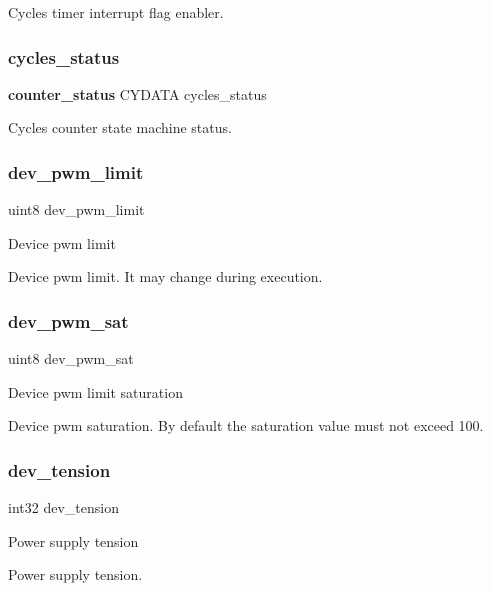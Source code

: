 Cycles timer interrupt flag enabler. \mbox{\label{globals_8h_a9087b28d15f17c6475922ba6943b14f3}} 
\subsubsection{cycles\+\_\+status}
{\footnotesize\ttfamily \textbf{ counter\+\_\+status} C\+Y\+D\+A\+TA cycles\+\_\+status}

Cycles counter state machine status. \mbox{\label{globals_8h_a21f4f67e4203dea0b9956589eaa6cef3}} 
\subsubsection{dev\+\_\+pwm\+\_\+limit}
{\footnotesize\ttfamily uint8 dev\+\_\+pwm\+\_\+limit}

Device pwm limit

Device pwm limit. It may change during execution. \mbox{\label{globals_8h_ad5c7a08c9d0e804a0db2d6f169976a13}} 
\subsubsection{dev\+\_\+pwm\+\_\+sat}
{\footnotesize\ttfamily uint8 dev\+\_\+pwm\+\_\+sat}

Device pwm limit saturation

Device pwm saturation. By default the saturation value must not exceed 100. \mbox{\label{globals_8h_a53a494e9edc739a4f7c884778d1a93b1}} 
\subsubsection{dev\+\_\+tension}
{\footnotesize\ttfamily int32 dev\+\_\+tension}

Power supply tension

Power supply tension. \mbox{\label{globals_8h_a600f1f02d397d3ffd8b03b8a4edace02}} 
